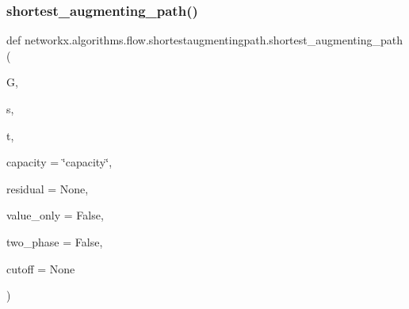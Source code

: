 \subsubsection{\texorpdfstring{shortest\+\_\+augmenting\+\_\+path()}{shortest\_augmenting\_path()}}
{\footnotesize\ttfamily def networkx.\+algorithms.\+flow.\+shortestaugmentingpath.\+shortest\+\_\+augmenting\+\_\+path (\begin{DoxyParamCaption}\item[{}]{G,  }\item[{}]{s,  }\item[{}]{t,  }\item[{}]{capacity = {\ttfamily \char`\"{}capacity\char`\"{}},  }\item[{}]{residual = {\ttfamily None},  }\item[{}]{value\+\_\+only = {\ttfamily False},  }\item[{}]{two\+\_\+phase = {\ttfamily False},  }\item[{}]{cutoff = {\ttfamily None} }\end{DoxyParamCaption})}

